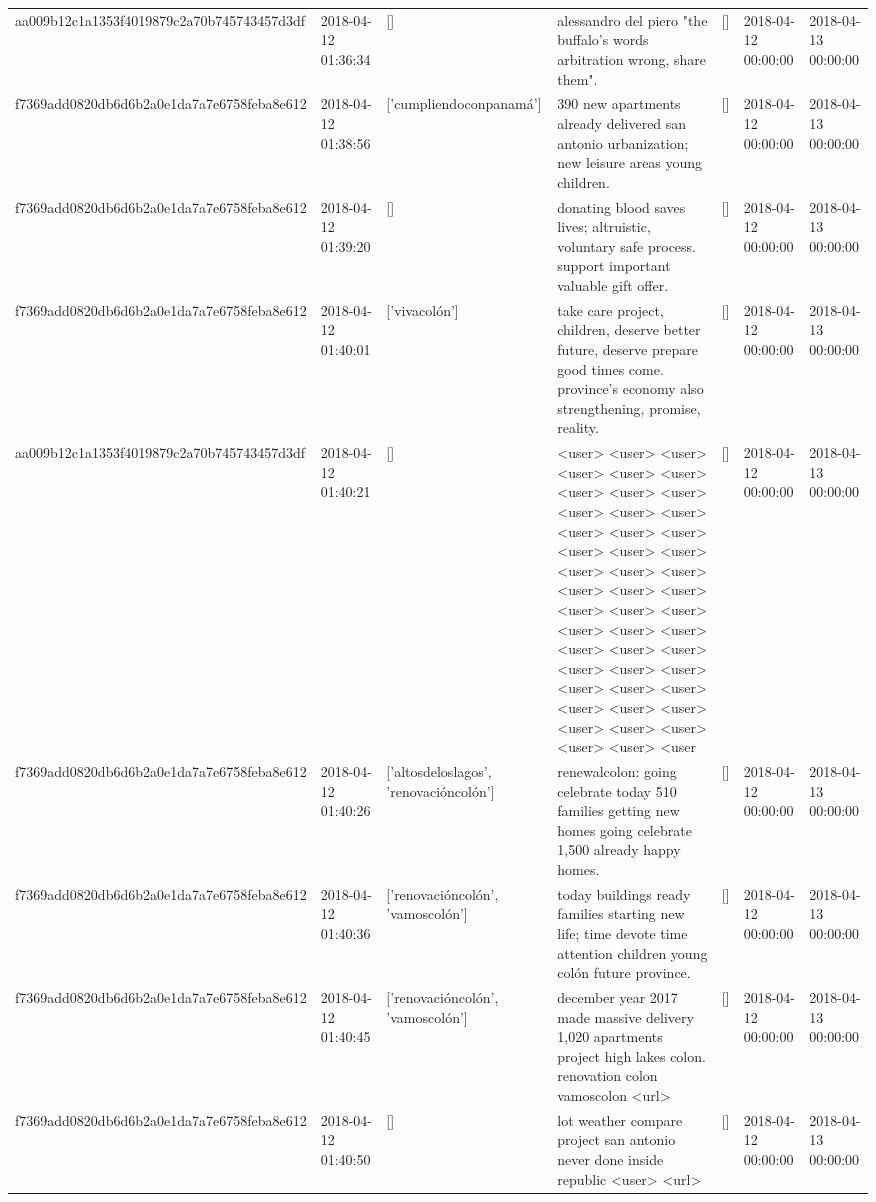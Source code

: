 \begin{tabular}{lllllll}
aa009b12c1a1353f4019879c2a70b745743457d3df & 2018-04-12 01:36:34 & [] & alessandro del piero "the buffalo's words arbitration wrong, share them". & [] & 2018-04-12 00:00:00 & 2018-04-13 00:00:00 \\
f7369add0820db6d6b2a0e1da7a7e6758feba8e612 & 2018-04-12 01:38:56 & ['cumpliendoconpanamá'] & 390 new apartments already delivered san antonio urbanization; new leisure areas young children. & [] & 2018-04-12 00:00:00 & 2018-04-13 00:00:00 \\
f7369add0820db6d6b2a0e1da7a7e6758feba8e612 & 2018-04-12 01:39:20 & [] & donating blood saves lives; altruistic, voluntary safe process. support important valuable gift offer. & [] & 2018-04-12 00:00:00 & 2018-04-13 00:00:00 \\
f7369add0820db6d6b2a0e1da7a7e6758feba8e612 & 2018-04-12 01:40:01 & ['vivacolón'] & take care project, children, deserve better future, deserve prepare good times come. province's economy also strengthening, promise, reality. & [] & 2018-04-12 00:00:00 & 2018-04-13 00:00:00 \\
aa009b12c1a1353f4019879c2a70b745743457d3df & 2018-04-12 01:40:21 & [] & <user> <user> <user> <user> <user> <user> <user> <user> <user> <user> <user> <user> <user> <user> <user> <user> <user> <user> <user> <user> <user> <user> <user> <user> <user> <user> <user> <user> <user> <user> <user> <user> <user> <user> <user> <user> <user> <user> <user> <user> <user> <user> <user> <user> <user> <user> <user> <user & [] & 2018-04-12 00:00:00 & 2018-04-13 00:00:00 \\
f7369add0820db6d6b2a0e1da7a7e6758feba8e612 & 2018-04-12 01:40:26 & ['altosdeloslagos', 'renovacióncolón'] & renewalcolon: going celebrate today 510 families getting new homes going celebrate 1,500 already happy homes. & [] & 2018-04-12 00:00:00 & 2018-04-13 00:00:00 \\
f7369add0820db6d6b2a0e1da7a7e6758feba8e612 & 2018-04-12 01:40:36 & ['renovacióncolón', 'vamoscolón'] & today buildings ready families starting new life; time devote time attention children young colón future province. & [] & 2018-04-12 00:00:00 & 2018-04-13 00:00:00 \\
f7369add0820db6d6b2a0e1da7a7e6758feba8e612 & 2018-04-12 01:40:45 & ['renovacióncolón', 'vamoscolón'] & december year 2017 made massive delivery 1,020 apartments project high lakes colon. renovation colon vamoscolon <url> & [] & 2018-04-12 00:00:00 & 2018-04-13 00:00:00 \\
f7369add0820db6d6b2a0e1da7a7e6758feba8e612 & 2018-04-12 01:40:50 & [] & lot weather compare project san antonio never done inside republic <user> <url> & [] & 2018-04-12 00:00:00 & 2018-04-13 00:00:00 \\

\end{tabular}
